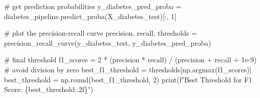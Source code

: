 \documentclass[
  letterpaper,
  DIV=11,
  numbers=noendperiod]{scrreprt}
\newenvironment{Shaded}{\begin{snugshade}}{\end{snugshade}}
\newcommand{\BuiltInTok}[1]{\textcolor[rgb]{0.00,0.23,0.31}{#1}}
\newcommand{\CommentTok}[1]{\textcolor[rgb]{0.37,0.37,0.37}{#1}}
\newcommand{\DecValTok}[1]{\textcolor[rgb]{0.68,0.00,0.00}{#1}}
\newcommand{\FloatTok}[1]{\textcolor[rgb]{0.68,0.00,0.00}{#1}}
\newcommand{\NormalTok}[1]{\textcolor[rgb]{0.00,0.23,0.31}{#1}}
\newcommand{\OperatorTok}[1]{\textcolor[rgb]{0.37,0.37,0.37}{#1}}
\newcommand{\SpecialCharTok}[1]{\textcolor[rgb]{0.37,0.37,0.37}{#1}}
\newcommand{\SpecialStringTok}[1]{\textcolor[rgb]{0.13,0.47,0.30}{#1}}
\begin{document}
\begin{Shaded}
\begin{Highlighting}[]
\CommentTok{\# get prediction probabilities}
\NormalTok{y\_diabetes\_pred\_proba }\OperatorTok{=}\NormalTok{ diabetes\_pipeline.predict\_proba(X\_diabetes\_test)[:, }\DecValTok{1}\NormalTok{]}

\CommentTok{\# plot the precision{-}recall curve}
\NormalTok{precision, recall, thresholds }\OperatorTok{=}\NormalTok{ precision\_recall\_curve(y\_diabetes\_test, y\_diabetes\_pred\_proba)}

\CommentTok{\# final threshold}
\NormalTok{f1\_scores }\OperatorTok{=} \DecValTok{2} \OperatorTok{*}\NormalTok{ (precision }\OperatorTok{*}\NormalTok{ recall) }\OperatorTok{/}\NormalTok{ (precision }\OperatorTok{+}\NormalTok{ recall }\OperatorTok{+} \FloatTok{1e{-}9}\NormalTok{) }\CommentTok{\# avoid division by zero}
\NormalTok{best\_f1\_threshold }\OperatorTok{=}\NormalTok{ thresholds[np.argmax(f1\_scores)]}
\NormalTok{best\_threshold }\OperatorTok{=}\NormalTok{ np.}\BuiltInTok{round}\NormalTok{(best\_f1\_threshold, }\DecValTok{2}\NormalTok{)}
\BuiltInTok{print}\NormalTok{(}\SpecialStringTok{f"Best Threshold for F1 Score: }\SpecialCharTok{\{}\NormalTok{best\_threshold}\SpecialCharTok{:.2f\}}\SpecialStringTok{"}\NormalTok{)}


\end{Highlighting}
\end{Shaded}
\end{document}
